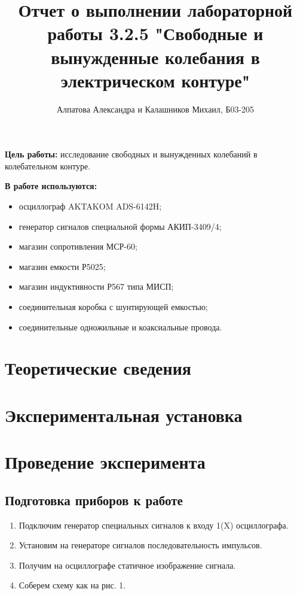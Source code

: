\documentclass[14pt, a4paper]{report}
\title{\textbf{Отчет о выполнении лабораторной работы 3.2.5 "Свободные и вынужденные колебания в электрическом контуре"}}
\author{Алпатова Александра и Калашников Михаил, Б03-205}
\date{}
\begin{document}
\maketitle

\textbf{Цель работы:}
исследование свободных и вынужденных колебаний в колебательном контуре.
\newline

\textbf{В работе используются:}
\begin{itemize}
\item осциллограф AKTAKOM ADS-6142H;
\item генератор сигналов специальной формы АКИП-3409/4;
\item магазин сопротивления МСР-60;
\item магазин емкости Р5025;
\item магазин индуктивности Р567 типа МИСП;
\item соединительная коробка с шунтирующей емкостью;
\item соединительные одножильные и коаксиальные провода.
\end{itemize}

\section{Теоретические сведения}

\section{Экспериментальная установка}


\section{Проведение эксперимента}

\subsection{Подготовка приборов к работе}

\begin{enumerate}

\setcounter{enumi}{0}

\item Подключим генератор специальных сигналов к входу 1(X) осциллографа.

\item Установим на генераторе сигналов последовательность импульсов.

\item Получим на осциллографе статичное изображение сигнала.

\item Соберем схему как на рис. 1.

\end{enumerate}
\end{document}
